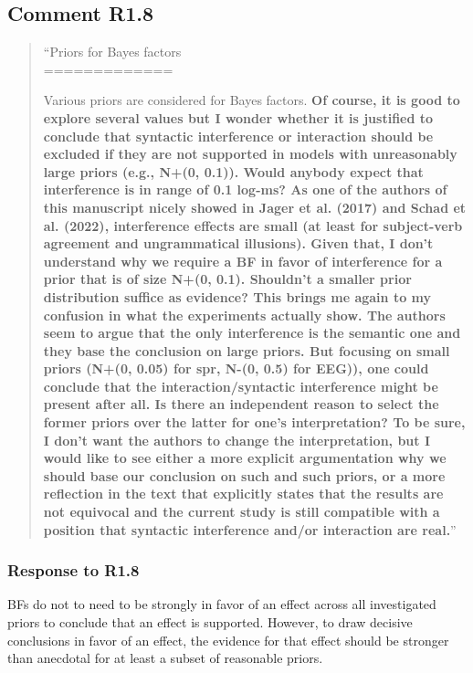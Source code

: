 \documentclass[12pt]{article}
\begin{document}
\subsection*{Comment R1.8}
\begin{quote}
``Priors for Bayes factors\\
=============

Various priors are considered for Bayes factors. \textbf{Of course, it is good to explore several values but I wonder whether it is justified to conclude that syntactic interference or interaction should be excluded if they are not supported in models with unreasonably large priors (e.g., N+(0, 0.1)). Would anybody expect that interference is in range of 0.1 log-ms? As one of the authors of this manuscript nicely showed in Jager et al. (2017) and Schad et al. (2022), interference effects are small (at least for subject-verb agreement and ungrammatical illusions). Given that, I don't understand why we require a BF in favor of interference for a prior that is of size N+(0, 0.1). Shouldn't a smaller prior distribution suffice as evidence? This brings me again to my confusion in what the experiments actually show. The authors seem to argue that the only interference is the semantic one and they base the conclusion on large priors. But focusing on small priors (N+(0, 0.05) for spr, N-(0, 0.5) for EEG)), one could conclude that the interaction/syntactic interference might be present after all. Is there an independent reason to select the former priors over the latter for one's interpretation? To be sure, I don't want the authors to change the interpretation, but I would like to see either a more explicit argumentation why we should base our conclusion on such and such priors, or a more reflection in the text that explicitly states that the results are not equivocal and the current study is still compatible with a position that syntactic interference and/or interaction are real.}''\end{quote}

\subsubsection*{Response to R1.8}
BFs do not to need to be strongly in favor of an effect across all investigated priors to conclude that an effect is supported. However, to draw decisive conclusions in favor of an effect, the evidence for that effect should be stronger than anecdotal for at least a subset of reasonable priors.
\end{document}
